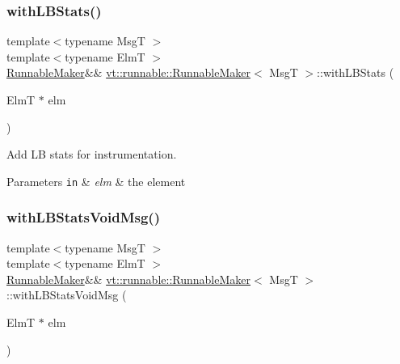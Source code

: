 \subsubsection{\texorpdfstring{with\+L\+B\+Stats()}{withLBStats()}\hspace{0.1cm}{\footnotesize\ttfamily [2/2]}}
{\footnotesize\ttfamily template$<$typename MsgT $>$ \\
template$<$typename ElmT $>$ \\
\hyperlink{structvt_1_1runnable_1_1_runnable_maker}{Runnable\+Maker}\&\& \hyperlink{structvt_1_1runnable_1_1_runnable_maker}{vt\+::runnable\+::\+Runnable\+Maker}$<$ MsgT $>$\+::with\+L\+B\+Stats (\begin{DoxyParamCaption}\item[{ElmT $\ast$}]{elm }\end{DoxyParamCaption})\hspace{0.3cm}{\ttfamily [inline]}}



Add LB stats for instrumentation. 


\begin{DoxyParams}[1]{Parameters}
\mbox{\tt in}  & {\em elm} & the element \\
\hline
\end{DoxyParams}
\mbox{\label{structvt_1_1runnable_1_1_runnable_maker_acce9921f014ab7220f9d7b3ca57e75d5}} 
\subsubsection{\texorpdfstring{with\+L\+B\+Stats\+Void\+Msg()}{withLBStatsVoidMsg()}}
{\footnotesize\ttfamily template$<$typename MsgT $>$ \\
template$<$typename ElmT $>$ \\
\hyperlink{structvt_1_1runnable_1_1_runnable_maker}{Runnable\+Maker}\&\& \hyperlink{structvt_1_1runnable_1_1_runnable_maker}{vt\+::runnable\+::\+Runnable\+Maker}$<$ MsgT $>$\+::with\+L\+B\+Stats\+Void\+Msg (\begin{DoxyParamCaption}\item[{ElmT $\ast$}]{elm }\end{DoxyParamCaption})\hspace{0.3cm}{\ttfamily [inline]}}



